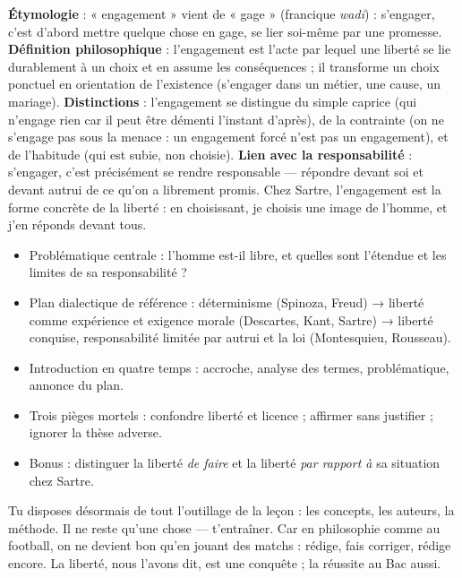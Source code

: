 \documentclass[11pt]{article}
\begin{document}
\begin{corrige}[Exercice 2]
\textbf{Étymologie} : « engagement » vient de « gage » (francique \emph{wadi}) : s'engager, c'est d'abord mettre quelque chose en gage, se lier soi-même par une promesse. \textbf{Définition philosophique} : l'engagement est l'acte par lequel une liberté se lie durablement à un choix et en assume les conséquences ; il transforme un choix ponctuel en orientation de l'existence (s'engager dans un métier, une cause, un mariage). \textbf{Distinctions} : l'engagement se distingue du simple caprice (qui n'engage rien car il peut être démenti l'instant d'après), de la contrainte (on ne s'engage pas sous la menace : un engagement forcé n'est pas un engagement), et de l'habitude (qui est subie, non choisie). \textbf{Lien avec la responsabilité} : s'engager, c'est précisément se rendre responsable — répondre devant soi et devant autrui de ce qu'on a librement promis. Chez Sartre, l'engagement est la forme concrète de la liberté : en choisissant, je choisis une image de l'homme, et j'en réponds devant tous.
\end{corrige}

\begin{aretenir}
\begin{itemize}
\item Problématique centrale : l'homme est-il libre, et quelles sont l'étendue et les limites de sa responsabilité ?
\item Plan dialectique de référence : déterminisme (Spinoza, Freud) → liberté comme expérience et exigence morale (Descartes, Kant, Sartre) → liberté conquise, responsabilité limitée par autrui et la loi (Montesquieu, Rousseau).
\item Introduction en quatre temps : accroche, analyse des termes, problématique, annonce du plan.
\item Trois pièges mortels : confondre liberté et licence ; affirmer sans justifier ; ignorer la thèse adverse.
\item Bonus : distinguer la liberté \emph{de faire} et la liberté \emph{par rapport à} sa situation chez Sartre.
\end{itemize}
\end{aretenir}

Tu disposes désormais de tout l'outillage de la leçon : les concepts, les auteurs, la méthode. Il ne reste qu'une chose — t'entraîner. Car en philosophie comme au football, on ne devient bon qu'en jouant des matchs : rédige, fais corriger, rédige encore. La liberté, nous l'avons dit, est une conquête ; la réussite au Bac aussi.
\end{document}
